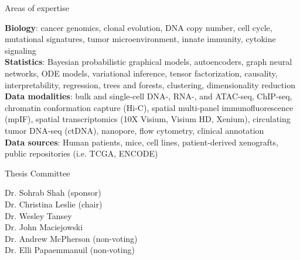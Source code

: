 \documentclass{resume} %
\begin{document}
\begin{rSection}{Areas of expertise}

\textbf{Biology}: cancer genomics, clonal evolution, DNA copy number, cell cycle, mutational signatures, tumor microenvironment, innate immunity, cytokine signaling \\
\textbf{Statistics}: Bayesian probabilistic graphical models, autoencoders, graph neural networks, ODE models, variational inference, tensor factorization, causality, interpretability, regression, trees and forests, clustering, dimensionality reduction \\
\textbf{Data modalities}: bulk and single-cell DNA-, RNA-, and ATAC-seq, ChIP-seq, chromatin conformation capture (Hi-C), spatial multi-panel immunofluorescence (mpIF), spatial transcriptomics (10X Visium, Visium HD, Xenium), circulating tumor DNA-seq (ctDNA), nanopore, flow cytometry, clinical annotation \\
\textbf{Data sources}: Human patients, mice, cell lines, patient-derived xenografts, public repositories (i.e. TCGA, ENCODE)


\end{rSection}


\begin{rSection}{Thesis Committee}

Dr. Sohrab Shah (sponsor) \\
Dr. Christina Leslie (chair) \\
Dr. Wesley Tansey \\
Dr. John Maciejowski \\
Dr. Andrew McPherson (non-voting) \\
Dr. Elli Papaemmanuil (non-voting)

\end{rSection}


\end{document}
